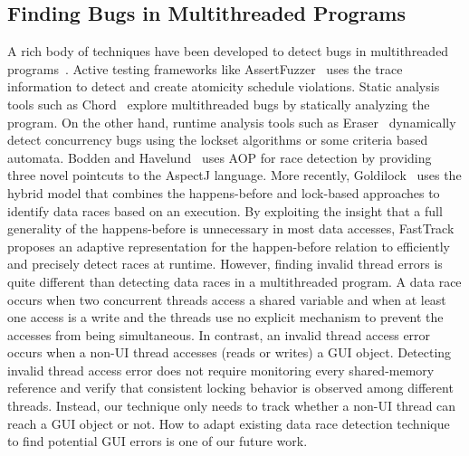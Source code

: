 
\subsection{Finding Bugs in Multithreaded Programs}



A rich body of techniques have been developed to detect bugs in multithreaded programs~\cite{Huang:2011:PPC:2001420.2001438, Weeratunge:2010, Huang:2011:EST}.
Active testing frameworks like AssertFuzzer~\cite{Sen:2008} uses the trace information to detect
and create atomicity schedule violations. Static analysis tools such as Chord~\cite{Naik:2006}
 explore multithreaded bugs by statically analyzing the program. On the
other hand, runtime analysis tools such as Eraser~\cite{Savage:1997}  dynamically detect concurrency bugs using the lockset
algorithms or some criteria based automata. Bodden and Havelund~\cite{Bodden:2008} uses AOP for
race detection by providing three novel pointcuts to the AspectJ language. More recently,
Goldilock~\cite{Elmas:2007} uses the hybrid model that combines the happens-before and lock-based
approaches to identify data races based on an execution. By exploiting the insight
that a full generality of the happens-before is unnecessary in most data accesses,
FastTrack~\cite{Flanagan:2009} proposes an adaptive representation for the happen-before
relation to efficiently and precisely detect races at runtime. However, finding
invalid thread errors is quite different than detecting data races in
a multithreaded program. A data race occurs when two concurrent threads access
a shared variable and when at least one access is a write and the threads
use no explicit mechanism to prevent the accesses from being simultaneous. In contrast,
an invalid thread access error occurs when a non-UI thread accesses (reads or writes) a GUI object.
Detecting invalid thread access error does not require monitoring every shared-memory
reference and verify that consistent locking behavior is observed among different threads. Instead,
our technique only needs to track whether a non-UI thread can reach a GUI object or not.
How to adapt existing data race detection technique to find potential
GUI errors is one of our future work.




